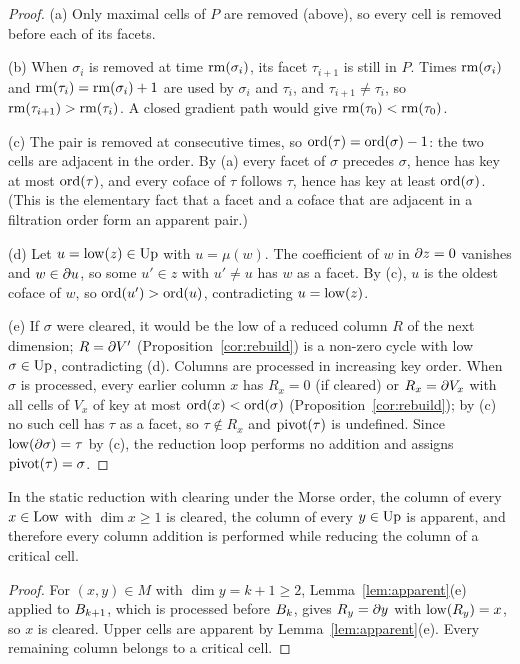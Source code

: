 \begin{proof}
(a) Only maximal cells of $P$ are removed (above), so every cell is removed
before each of its facets.

(b) When $\sigma_i$ is removed at time $\operatorname{rm}(\sigma_i)$, its facet $\tau_{i+1}$ is
still in $P$. Times $\operatorname{rm}(\sigma_i)$ and $\operatorname{rm}(\tau_i)=\operatorname{rm}(\sigma_i)+1$ are
used by $\sigma_i$ and $\tau_i$, and $\tau_{i+1}\ne\tau_i$, so
$\operatorname{rm}(\tau_{i+1})>\operatorname{rm}(\tau_i)$. A closed gradient path would give
$\operatorname{rm}(\tau_0)<\operatorname{rm}(\tau_0)$.

(c) The pair is removed at consecutive times, so $\operatorname{ord}(\tau)=\operatorname{ord}(\sigma)-1$:
the two cells are adjacent in the order. By (a) every facet of $\sigma$ precedes
$\sigma$, hence has key at most $\operatorname{ord}(\tau)$, and every coface of $\tau$ follows
$\tau$, hence has key at least $\operatorname{ord}(\sigma)$. (This is the elementary fact that
a facet and a coface that are adjacent in a filtration order form an apparent
pair.)

(d) Let $u=\operatorname{low}(z)\in\mathrm{Up}$ with $u=\mu(w)$. The coefficient of $w$ in $\partial z=0$
vanishes and $w\in\partial u$, so some $u'\in z$ with $u'\ne u$ has $w$ as a facet.
By (c), $u$ is the oldest coface of $w$, so $\operatorname{ord}(u')>\operatorname{ord}(u)$, contradicting
$u=\operatorname{low}(z)$.

(e) If $\sigma$ were cleared, it would be the low of a reduced column $R$ of the
next dimension; $R=\partial V'$ (Proposition~\ref{cor:rebuild}) is a non-zero cycle with
low $\sigma\in\mathrm{Up}$, contradicting (d). Columns are processed in increasing key
order. When $\sigma$ is processed, every earlier column $x$ has $R_x=0$ (if
cleared) or $R_x=\partial V_x$ with all cells of $V_x$ of key at most
$\operatorname{ord}(x)<\operatorname{ord}(\sigma)$ (Proposition~\ref{cor:rebuild}); by (c) no such cell has
$\tau$ as a facet, so $\tau\notin R_x$ and $\operatorname{pivot}(\tau)$ is undefined. Since
$\operatorname{low}(\partial\sigma)=\tau$ by (c), the reduction loop performs no addition and
assigns $\operatorname{pivot}(\tau)=\sigma$.
\end{proof}

\begin{corollary}\label{cor:critical-work}
In the static reduction with clearing under the Morse order, the column of every
$x\in\mathrm{Low}$ with $\dim x\ge1$ is cleared, the column of every $y\in\mathrm{Up}$ is
apparent, and therefore every column addition is performed while reducing the
column of a critical cell.
\end{corollary}

\begin{proof}
For $(x,y)\in M$ with $\dim y=k+1\ge2$, Lemma~\ref{lem:apparent}(e) applied to
$B_{k+1}$, which is processed before $B_{k}$, gives $R_y=\partial y$ with
$\operatorname{low}(R_y)=x$, so $x$ is cleared. Upper cells are apparent by
Lemma~\ref{lem:apparent}(e). Every remaining column belongs to a critical cell.
\end{proof}

